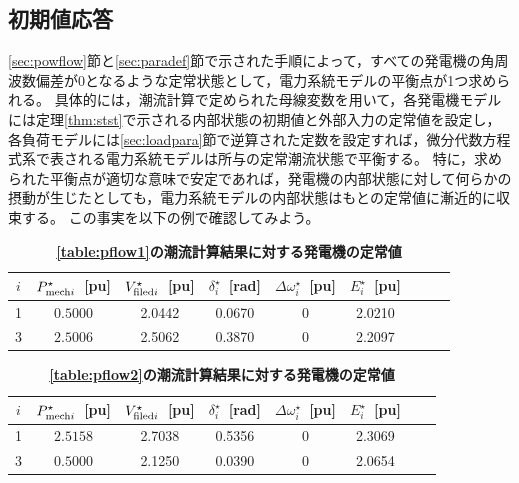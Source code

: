 \documentclass[tombow,dvipdfmx]{corona-a5-1.1}
\begin{document}
\subsection{初期値応答}

\ref{sec:powflow}節と\ref{sec:paradef}節で示された手順によって，すべての発電機の角周波数偏差が0となるような定常状態として，電力系統モデルの平衡点が1つ求められる。
具体的には，潮流計算で定められた母線変数を用いて，各発電機モデルには定理\ref{thm:stst}で示される内部状態の初期値と外部入力の定常値を設定し，各負荷モデルには\ref{sec:loadpara}節で逆算された定数を設定すれば，微分代数方程式系で表される電力系統モデルは所与の定常潮流状態で平衡する。
特に，求められた平衡点が適切な意味で安定であれば，発電機の内部状態に対して何らかの摂動が生じたとしても，電力系統モデルの内部状態はもとの定常値に漸近的に収束する。
この事実を以下の例で確認してみよう。

\begin{table}[h]
\medskip
 \caption{\textbf{\ref{table:pflow1}の潮流計算結果に対する発電機の定常値}}
 \label{table:genst13a}
 \centering
  \begin{tabular}{ccccccccc}
   \hline
$i$ &  $P_{{\rm mech}i}^{\star}$~[pu] & $V_{{\rm filed}i}^{\star}$~[pu] & $\delta_i^{\star}$~[rad] & $\Delta \omega_i^{\star}$~[pu] & $E_i^{\star}$~[pu] \\
   \hline \hline
1 & $0.5000$ & 2.0442 & 0.0670 & 0 & 2.0210 \\
3 & $2.5006$ & 2.5062 & 0.3870 & 0 & 2.2097 \\
   \hline
  \end{tabular}
\end{table}

\begin{table}[h]
\medskip
 \caption{\textbf{\ref{table:pflow2}の潮流計算結果に対する発電機の定常値}}
 \label{table:genst13b}
 \centering
  \begin{tabular}{cccccccc}
   \hline
$i$ &  $P_{{\rm mech}i}^{\star}$~[pu] & $V_{{\rm filed}i}^{\star}$~[pu] & $\delta_i^{\star}$~[rad] & $\Delta \omega_i^{\star}$~[pu] & $E_i^{\star}$~[pu] \\
   \hline \hline
1 & $2.5158$ & 2.7038 & 0.5356 & 0 & 2.3069 \\
3 & $0.5000$ & 2.1250 & 0.0390 & 0 & 2.0654 \\
   \hline
  \end{tabular}
\end{table}
\end{document}
